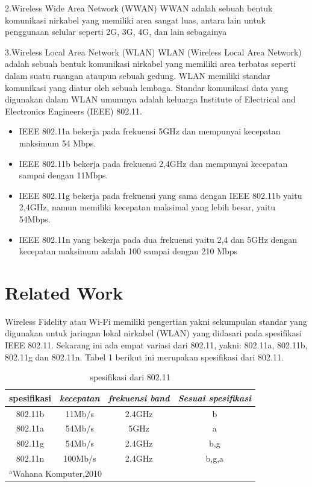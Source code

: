 \documentclass[conference]{IEEEtran}
\begin{document}
2.Wireless Wide Area Network (WWAN)
WWAN adalah sebuah bentuk komunikasi nirkabel yang memiliki area sangat luas, antara lain untuk penggunaan selular seperti 2G, 3G, 4G, dan lain sebagainya
\vspace{5pt}

3.Wireless Local Area Network (WLAN)
WLAN (Wireless Local Area Network) adalah sebuah bentuk komunikasi nirkabel yang memiliki area terbatas seperti dalam suatu ruangan ataupun sebuah gedung. WLAN memiliki standar komunikasi yang diatur oleh sebuah lembaga. Standar komunikasi data yang digunakan dalam WLAN umumnya adalah keluarga Institute of Electrical and Electronics Engineers (IEEE) 802.11.
\begin{itemize}
    \item  IEEE 802.11a bekerja pada frekuensi 5GHz dan mempunyai kecepatan maksimum 54 Mbps.
    \item IEEE 802.11b bekerja pada frekuensi 2,4GHz dan mempunyai kecepatan sampai dengan 11Mbps.
    \item IEEE 802.11g bekerja pada frekuensi yang sama dengan IEEE 802.11b yaitu 2,4GHz, namun memiliki kecepatan maksimal yang lebih besar, yaitu 54Mbps.
    \item   IEEE 802.11n yang bekerja pada dua frekuensi yaitu 2,4 dan 5GHz dengan kecepatan maksimum adalah 100 sampai dengan 210 Mbps
\end{itemize}

\section{Related Work}
Wireless Fidelity atau Wi-Fi memiliki pengertian yakni sekumpulan standar yang digunakan untuk jaringan lokal nirkabel (WLAN) yang didasari pada spesifikasi IEEE 802.11. Sekarang ini ada empat variasi dari 802.11, yakni: 802.11a, 802.11b, 802.11g dan 802.11n. Tabel 1 berikut ini merupakan spesifikasi dari 802.11.

\begin{table}[htbp]
    \caption{spesifikasi dari 802.11}
    \begin{center}
    \begin{tabular}{|c|c|c|c|}
        \hline
    \textbf{spesifikasi} & \textbf{\textit{kecepatan}}& \textbf{\textit{frekuensi band}}& \textbf{\textit{Sesuai spesifikasi}} \\
    \hline
    802.11b & 11Mb/s & 2.4GHz & b  \\
    \hline
    802.11a & 54Mb/s & 5GHz & a  \\
    \hline
    802.11g & 54Mb/s & 2.4GHz & b,g  \\
    \hline
    802.11n & 100Mb/s & 2.4GHz & b,g,a  \\
    \hline
    \multicolumn{4}{l}{$^{\mathrm{a}}$Wahana Komputer,2010}
    \end{tabular}
    \label{tab1}
    \end{center}
    \end{table}
\end{document}

